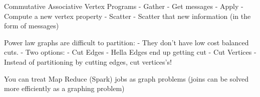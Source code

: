 \documentclass[3pt,landscape]{article}
\makeatletter
\renewcommand{\section}{\@startsection{section}{1}{0mm}{-1ex plus -.5ex minus -.2ex}{0.5ex plus .2ex}{\normalfont\large\bfseries}}
\renewcommand{\subsection}{\@startsection{subsection}{2}{0mm}{-1explus -.5ex minus -.2ex}{0.5ex plus .2ex}{\normalfont\normalsize\bfseries}}
\makeatother
\begin{document}
\begin{multicols}{3}
Commutative Associative Vertex Programs
- Gather - Get messages
- Apply  - Compute a new vertex property
- Scatter - Scatter that new information (in the form of messages)


Power law graphs are difficult to partition:
- They don’t have low cost balanced cuts. 
- Two options:
  - Cut Edges
    - Hella Edges end up getting cut
  - Cut Vertices
- Instead of partitioning by cutting edges, cut vertices's! 

You can treat Map Reduce (Spark) jobs as graph problems (joins can be solved more efficiently as a graphing problem)












\end{multicols}
\end{document}
